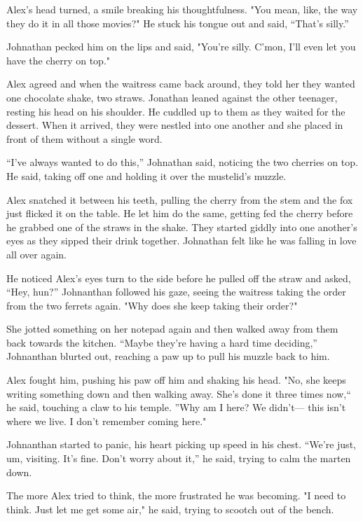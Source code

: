 Alex's head turned, a smile breaking his thoughtfulness. "You mean,
like, the way they do it in all those movies?" He stuck his tongue out
and said, ``That's silly.''

Johnathan pecked him on the lips and said, "You're silly. C'mon, I'll
even let you have the cherry on top."

Alex agreed and when the waitress came back around, they told her they
wanted one chocolate shake, two straws. Jonathan leaned against the
other teenager, resting his head on his shoulder. He cuddled up to them
as they waited for the dessert. When it arrived, they were nestled into
one another and she placed in front of them without a single word.

``I've always wanted to do this,'' Johnathan said, noticing the two
cherries on top. He said, taking off one and holding it over the
mustelid's muzzle.

Alex snatched it between his teeth, pulling the cherry from the stem and
the fox just flicked it on the table. He let him do the same, getting
fed the cherry before he grabbed one of the straws in the shake. They
started giddly into one another's eyes as they sipped their drink
together. Johnathan felt like he was falling in love all over again.

He noticed Alex's eyes turn to the side before he pulled off the straw
and asked, ``Hey, hun?'' Johnanthan followed his gaze, seeing the waitress
taking the order from the two ferrets again. "Why does she keep taking
their order?"

She jotted something on her notepad again and then walked away from them
back towards the kitchen. ``Maybe they're having a hard time deciding,''
Johnanthan blurted out, reaching a paw up to pull his muzzle back to
him.

Alex fought him, pushing his paw off him and shaking his head. "No, she
keeps writing something down and then walking away. She's done it three
times now,`` he said, touching a claw to his temple. ''Why am I here? We
didn't--- this isn't where we live. I don't remember coming here."

Johnanthan started to panic, his heart picking up speed in his chest.
``We're just, um, visiting. It's fine. Don't worry about it,'' he said,
trying to calm the marten down.

The more Alex tried to think, the more frustrated he was becoming. "I
need to think. Just let me get some air," he said, trying to scootch out
of the bench.

